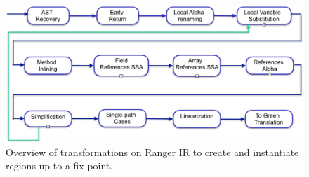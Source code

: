 \begin{figure}[]
    \caption{Overview of transformations on Ranger IR to create and instantiate regions up to a fix-point.}
    \label{fig:overview}
    \includegraphics[width=1.5\columnwidth]{figures/transformations.pdf}
\end{figure}
%
%
%

